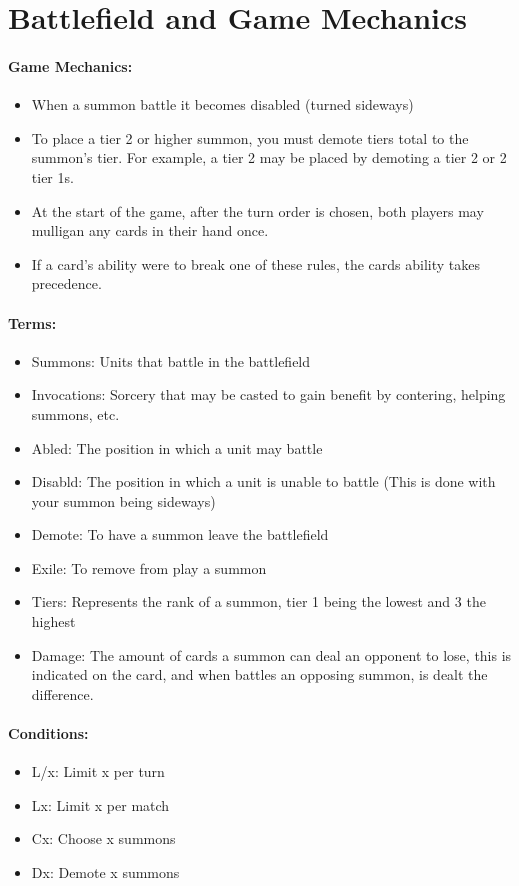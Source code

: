 \documentclass[12pt, letterpaper]{article}
\begin{document}
   \section{Battlefield and Game Mechanics}
   \paragraph{Game Mechanics: \\}
   \begin{itemize}
       \item When a summon battle it becomes disabled (turned sideways)
       \item To place a tier 2 or higher summon, you must demote tiers total to the summon's tier. 
       For example, a tier 2 may be placed by demoting a tier 2 or 2 tier 1s.
       \item At the start of the game, after the turn order is chosen, both players may mulligan any cards in their hand once.
        \item If a card’s ability were to break one of these rules, the cards ability takes precedence.
   \end{itemize}
   \paragraph{Terms:\\}
   \begin{itemize}
       \item Summons: Units that battle in the battlefield
       \item Invocations: Sorcery that may be casted to gain benefit by contering, helping summons, etc.
       \item Abled: The position in which a unit may battle
       \item Disabld: The position in which a unit is unable to battle (This is done with your summon being sideways)
       \item Demote: To have a summon leave the battlefield
       \item Exile: To remove from play a summon
       \item Tiers: Represents the rank of a summon, tier 1 being the lowest and 3 the highest
       \item Damage: The amount of cards a summon can deal an opponent to lose, this is indicated on the card, and when battles an opposing summon, is dealt the difference.
   \end{itemize}
   \paragraph{Conditions:}
   \begin{itemize}
       \item L/x: Limit x per turn
       \item Lx: Limit x per match
       \item Cx: Choose x summons 
       \item Dx: Demote x summons  
   \end{itemize}
\end{document}
